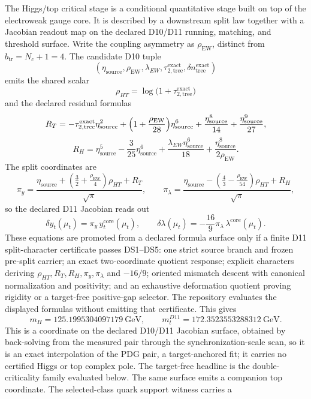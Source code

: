 \documentclass[11pt]{article}
\begin{document}
The Higgs/top critical stage is a conditional quantitative stage built on top of the electroweak gauge core.
It is described by a downstream split law together with a Jacobian readout map
on the declared D10/D11 running, matching, and threshold surface.  Write the
coupling asymmetry as \(\rho_{\mathrm{EW}}\), distinct from
\(b_{\mathrm{tr}}=N_c+1=4\). The candidate D10 tuple
\[
(\eta_{\mathrm{source}},\rho_{\mathrm{EW}},\lambda_{EW},\tau_{2,\mathrm{tree}}^{\mathrm{exact}},\delta n_{\mathrm{tree}}^{\mathrm{exact}})
\]
emits the shared scalar
\[
\rho_{HT}=\log\!\bigl(1+\tau_{2,\mathrm{tree}}^{\mathrm{exact}}\bigr)
\]
and the declared residual formulas
\[
R_T=
-\tau_{2,\mathrm{tree}}^{\mathrm{exact}}\eta_{\mathrm{source}}^2
+\Bigl(1+\frac{\rho_{\mathrm{EW}}}{28}\Bigr)\eta_{\mathrm{source}}^6
+\frac{\eta_{\mathrm{source}}^8}{14}
+\frac{\eta_{\mathrm{source}}^9}{27},
\]
\[
R_H=
\eta_{\mathrm{source}}^5
-\frac{3}{25}\eta_{\mathrm{source}}^6
+\frac{\lambda_{EW}\eta_{\mathrm{source}}^6}{18}
+\frac{\eta_{\mathrm{source}}^8}{2\rho_{\mathrm{EW}}}.
\]
The split coordinates are
\[
\pi_y=
\frac{\eta_{\mathrm{source}}+\left(\frac32+\frac{\rho_{\mathrm{EW}}}4\right)\rho_{HT}+R_T}{\sqrt{\pi}},
\qquad
\pi_\lambda=
\frac{\eta_{\mathrm{source}}-\left(\frac43-\frac{\rho_{\mathrm{EW}}}{54}\right)\rho_{HT}+R_H}{\sqrt{\pi}},
\]
so the declared D11 Jacobian reads out
\[
\delta y_t(\mu_t)=\pi_y\,y_t^{\mathrm{core}}(\mu_t),
\qquad
\delta\lambda(\mu_t)=-\frac{16}{9}\pi_\lambda\,\lambda^{\mathrm{core}}(\mu_t).
\]
These equations are promoted from a declared formula surface only if a finite
D11 split-character certificate passes DS1--DS5: one strict source branch and
frozen pre-split carrier; an exact two-coordinate quotient response; explicit
characters deriving \(\rho_{HT},R_T,R_H,\pi_y,\pi_\lambda\) and \(-16/9\);
oriented mismatch descent with canonical normalization and positivity; and an
exhaustive deformation quotient proving rigidity or a target-free positive-gap
selector.  The repository evaluates the displayed formulas without emitting
that certificate.
This gives
\[
m_H = 125.1995304097179~\mathrm{GeV},
\qquad
m_t^{D11} = 172.3523553288312~\mathrm{GeV}.
\]
This is a coordinate on the declared D10/D11 Jacobian surface, obtained by
back-solving from the measured pair through the synchronization-scale scan, so
it is an exact interpolation of the PDG pair, a target-anchored fit; it
carries no certified Higgs or top complex pole. The
target-free headline is the double-criticality family evaluated below. The same surface emits a companion top coordinate.
The selected-class quark support witness carries a
\end{document}
